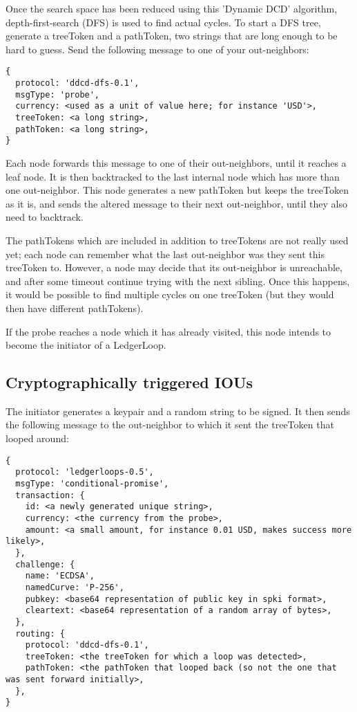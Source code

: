 \documentclass[11pt,twoside,a4paper]{article}
\begin{document}
Once the search space has been reduced using this 'Dynamic DCD' algorithm, depth-first-search (DFS) is used to find actual cycles. To start a DFS tree, generate a treeToken and a pathToken, two strings that are long enough to be hard to guess. Send the following message to one of your out-neighbors:

\begin{lstlisting}
{
  protocol: 'ddcd-dfs-0.1',
  msgType: 'probe',
  currency: <used as a unit of value here; for instance 'USD'>,
  treeToken: <a long string>,
  pathToken: <a long string>,
}
\end{lstlisting}

Each node forwards this message to one of their out-neighbors, until it reaches a leaf node. It is then backtracked to the last internal node which has more than one out-neighbor. This node generates a new pathToken but keeps the treeToken as it is, and sends the altered message to their next out-neighbor, until they also need to backtrack.

The pathTokens which are included in addition to treeTokens are not really used yet; each node can remember what the last out-neighbor was they sent this treeToken to. However, a node may decide that its out-neighbor is unreachable, and after some timeout continue trying with the next sibling. Once this happens, it would be possible to find multiple cycles on one treeToken (but they would then have different pathTokens).

If the probe reaches a node which it has already visited, this node intends to become the initiator of a LedgerLoop.
\subsection{Cryptographically triggered IOUs}

The initiator generates a keypair and a random string to be signed. It then sends the following message to the out-neighbor to which it sent the treeToken that looped around:

\begin{lstlisting}
{
  protocol: 'ledgerloops-0.5',
  msgType: 'conditional-promise',
  transaction: {
    id: <a newly generated unique string>,
    currency: <the currency from the probe>,
    amount: <a small amount, for instance 0.01 USD, makes success more likely>,
  },
  challenge: {
    name: 'ECDSA',
    namedCurve: 'P-256',
    pubkey: <base64 representation of public key in spki format>,
    cleartext: <base64 representation of a random array of bytes>,
  },
  routing: {
    protocol: 'ddcd-dfs-0.1',
    treeToken: <the treeToken for which a loop was detected>,
    pathToken: <the pathToken that looped back (so not the one that was sent forward initially>,
  },
}
\end{lstlisting}
\end{document}
